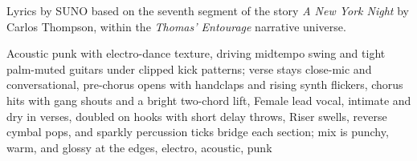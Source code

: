 
\begin{notes}
Lyrics by SUNO based on the seventh segment of the story \emph{A New York Night} by Carlos Thompson, %
within the \emph{Thomas’ Entourage} narrative universe.
\end{notes}
\begin{style}
Acoustic punk with electro-dance texture, driving midtempo swing and tight palm-muted guitars under clipped kick patterns; verse stays close-mic and conversational, pre-chorus opens with handclaps and rising synth flickers, chorus hits with gang shouts and a bright two-chord lift, Female lead vocal, intimate and dry in verses, doubled on hooks with short delay throws, Riser swells, reverse cymbal pops, and sparkly percussion ticks bridge each section; mix is punchy, warm, and glossy at the edges, electro, acoustic, punk
\end{style}
